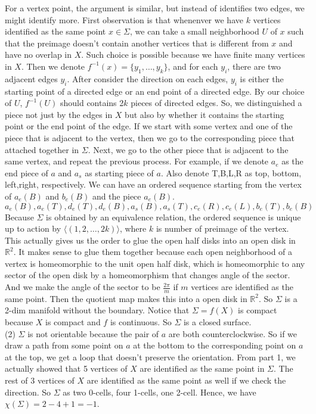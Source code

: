 \documentclass[12pt]{amsart}
\newcommand{\R}{\mathbb{R}}
\begin{document}
For a vertex point, the argument is similar, but instead of identifies two edges, we might identify more. First observation is that whenenver we have $k$ vertices identified as the same point $x\in\Sigma$, we can take a small neighborhood $U$ of $x$ such that the preimage doesn't contain another vertices that is different from $x$ and have no overlap in $X$. Such choice is possible because we have finite many vertices in $X$. Then we denote $f^{-1}(x)=\{y_1,\dots,y_k\}$, and for each $y_i$, there are two adjacent edges $y_i$. After consider the direction on each edges, $y_i$ is either the starting point of a directed edge or an end point of a directed edge. By our choice of $U$, $f^{-1}(U)$ should contains 2$k$ pieces of directed edges. So, we distinguished a piece not just by the edges in $X$ but also by whether it contains the starting point or the end point of the edge. If we start with some vertex and one of the piece that is adjacent to the vertex, then we go to the corresponding piece that attached together in $\Sigma$. Next, we go to the other piece that is adjacent to the same vertex, and repeat the previous process. For example, if we denote $a_e$ as the end piece of $a$ and $a_s$ as starting piece of $a$. Also denote T,B,L,R as top, bottom, left,right, respectively. We can have an ordered sequence starting from the vertex of $a_e(B)$ and $b_e(B)$ and the piece $a_e(B)$.
\[a_e(B),a_e(T),d_e(T),d_e(B),a_s(B),a_s(T),c_e(R),c_e(L),b_e(T),b_e(B)\]
Because $\Sigma$ is obtained by an equivalence relation, the ordered sequence is unique up to action by $\langle(1,2,\dots,2k)\rangle$, where $k$ is number of preimage of the vertex. This actually gives us the order to glue the open half disks into an open disk in $\R^2$. It makes sense to glue them together because each open neighborhood of a vertex is homeomorphic to the unit open half disk, which is homeomorphic to any sector of the open disk by a homeomorphism that changes angle of the sector. And we make the angle of the sector to be $\frac{2\pi}{m}$ if $m$ vertices are identified as the same point. Then the quotient map makes this into a open disk in $\R^2$. So $\Sigma$ is a 2-dim manifold without the boundary. Notice that $\Sigma=f(X)$ is compact because $X$ is compact and $f$ is continuous. So $\Sigma$ is a closed surface.\\
(2) $\Sigma$ is not orientable because the pair of $a$ are both counterclockwise. So if we draw a path from some point on $a$ at the bottom to the corresponding point on $a$ at the top, we get a loop that doesn't preserve the orientation. From part 1, we actually showed that 5 vertices of $X$ are identified as the same point in $\Sigma$. The rest of 3 vertices of $X$ are identified as the same point as well if we check the direction. So $\Sigma$ as two 0-cells, four 1-cells, one 2-cell. Hence, we have $\chi(\Sigma)=2-4+1=-1$.\\
\end{document}
